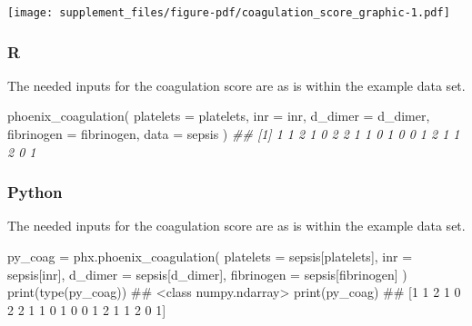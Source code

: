 \documentclass[
  letterpaper,
  DIV=11,
  numbers=noendperiod]{scrartcl}
\newenvironment{Shaded}{\begin{snugshade}}{\end{snugshade}}
\newcommand{\AttributeTok}[1]{\textcolor[rgb]{0.40,0.45,0.13}{#1}}
\newcommand{\BuiltInTok}[1]{\textcolor[rgb]{0.00,0.23,0.31}{#1}}
\newcommand{\CommentTok}[1]{\textcolor[rgb]{0.37,0.37,0.37}{#1}}
\newcommand{\DocumentationTok}[1]{\textcolor[rgb]{0.37,0.37,0.37}{\textit{#1}}}
\newcommand{\FunctionTok}[1]{\textcolor[rgb]{0.28,0.35,0.67}{#1}}
\newcommand{\NormalTok}[1]{\textcolor[rgb]{0.00,0.23,0.31}{#1}}
\newcommand{\OperatorTok}[1]{\textcolor[rgb]{0.37,0.37,0.37}{#1}}
\newcommand{\StringTok}[1]{\textcolor[rgb]{0.13,0.47,0.30}{#1}}
\begin{document}
\texttt{[image: supplement\_files/figure-pdf/coagulation\_score\_graphic-1.pdf]}

\subsubsection{R}\label{r-4}

The needed inputs for the coagulation score are as is within the example
data set.

\begin{Shaded}
\begin{Highlighting}[]
\FunctionTok{phoenix\_coagulation}\NormalTok{(}
  \AttributeTok{platelets =}\NormalTok{ platelets,}
  \AttributeTok{inr =}\NormalTok{ inr,}
  \AttributeTok{d\_dimer =}\NormalTok{ d\_dimer,}
  \AttributeTok{fibrinogen =}\NormalTok{ fibrinogen,}
  \AttributeTok{data =}\NormalTok{ sepsis}
\NormalTok{)}
\DocumentationTok{\#\#  [1] 1 1 2 1 0 2 2 1 1 0 1 0 0 1 2 1 1 2 0 1}
\end{Highlighting}
\end{Shaded}

\subsubsection{Python}\label{python-4}

The needed inputs for the coagulation score are as is within the example
data set.

\begin{Shaded}
\begin{Highlighting}[]
\NormalTok{py\_coag }\OperatorTok{=}\NormalTok{ phx.phoenix\_coagulation(}
\NormalTok{    platelets }\OperatorTok{=}\NormalTok{ sepsis[}\StringTok{\textquotesingle{}platelets\textquotesingle{}}\NormalTok{],}
\NormalTok{    inr }\OperatorTok{=}\NormalTok{ sepsis[}\StringTok{\textquotesingle{}inr\textquotesingle{}}\NormalTok{],}
\NormalTok{    d\_dimer }\OperatorTok{=}\NormalTok{ sepsis[}\StringTok{\textquotesingle{}d\_dimer\textquotesingle{}}\NormalTok{],}
\NormalTok{    fibrinogen }\OperatorTok{=}\NormalTok{ sepsis[}\StringTok{\textquotesingle{}fibrinogen\textquotesingle{}}\NormalTok{]}
\NormalTok{)}
\BuiltInTok{print}\NormalTok{(}\BuiltInTok{type}\NormalTok{(py\_coag))}
\CommentTok{\#\# \textless{}class \textquotesingle{}numpy.ndarray\textquotesingle{}\textgreater{}}
\BuiltInTok{print}\NormalTok{(py\_coag)}
\CommentTok{\#\# [1 1 2 1 0 2 2 1 1 0 1 0 0 1 2 1 1 2 0 1]}
\end{Highlighting}
\end{Shaded}
\end{document}
